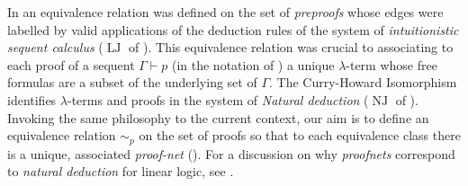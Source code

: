 \documentclass[12pt]{article}
\theoremstyle{plain}
\theoremstyle{definition}
\begin{document}
In \cite{GMZ} an equivalence relation was defined on the set of \emph{preproofs} whose edges were labelled by valid applications of the deduction rules of the system of \emph{intuitionistic sequent calculus} ($\operatorname{LJ}$ of \cite[\S III]{gentzen}). This equivalence relation was crucial to associating to each proof of a sequent $\Gamma \vdash p$ (in the notation of \cite{GMZ}) a unique $\lambda$-term whose free formulas are a subset of the underlying set of $\Gamma$. The Curry-Howard Isomorphism identifies $\lambda$-terms and proofs in the system of \emph{Natural deduction} ($\operatorname{NJ}$ of \cite{gentzen}). Invoking the same philosophy to the current context, our aim is to define an equivalence relation $\sim_p$ on the set of proofs so that to each equivalence class there is a unique, associated \emph{proof-net} (\cite{linear_logic}). For a discussion on why \emph{proofnets} correspond to \emph{natural deduction} for linear logic, see \cite[\S 11.2]{blind}.
\end{document}
